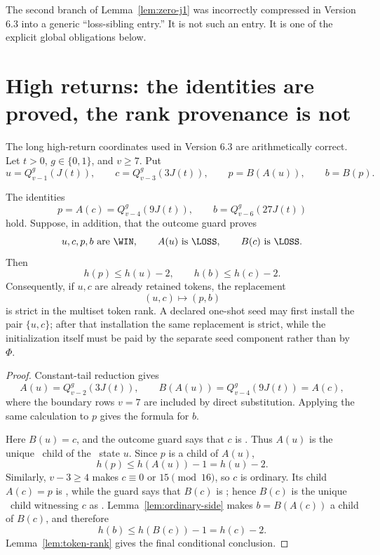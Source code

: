 The second branch of Lemma~\ref{lem:zero-j1} was incorrectly compressed in
Version 6.3 into a generic ``loss-sibling entry.''  It is not such an entry.
It is one of the explicit global obligations below.

\section{High returns: the identities are proved, the rank provenance is not}

The long high-return coordinates used in Version 6.3 are arithmetically
correct.  Let $t>0$, $g\in\{0,1\}$, and $v\ge7$.  Put
\[
 u=Q_{v-1}^g(J(t)),
 \qquad
 c=Q_{v-3}^g(3J(t)),
 \qquad
 p=B(A(u)),
 \qquad
 b=B(p).
\]

\begin{lemma}\label{lem:high-return}
The identities
\[
 p=A(c)=Q_{v-4}^g(9J(t)),
 \qquad
 b=Q_{v-6}^g(27J(t))
\]
hold.  Suppose, in addition, that the outcome guard proves
\[
 u,c,p,b\text{ are \WIN},
 \qquad A(u)\text{ is \LOSS},
 \qquad B(c)\text{ is \LOSS}.
\]
Then
\[
 h(p)\le h(u)-2,
 \qquad
 h(b)\le h(c)-2.
\]
Consequently, if $u,c$ are already retained tokens, the replacement
\[
  (u,c)\longmapsto(p,b)
\]
is strict in the multiset token rank.  A declared one-shot seed may first
install the pair $\{u,c\}$; after that installation the same replacement
is strict, while the initialization itself must be paid by the separate
seed component rather than by $\Phi$.
\end{lemma}

\begin{proof}
Constant-tail reduction gives
\[
 A(u)=Q_{v-2}^g(3J(t)),
 \qquad
 B(A(u))=Q_{v-4}^g(9J(t))=A(c),
\]
where the boundary rows $v=7$ are included by direct substitution.  Applying
the same calculation to $p$ gives the formula for $b$.

Here $B(u)=c$, and the outcome guard says that $c$ is \WIN.  Thus
$A(u)$ is the unique \LOSS\ child of the \WIN\ state $u$.  Since $p$ is a
child of $A(u)$,
\[
 h(p)\le h(A(u))-1=h(u)-2.
\]
Similarly, $v-3\ge4$ makes $c\equiv0$ or $15\pmod {16}$, so $c$ is
ordinary.  Its child $A(c)=p$ is \WIN, while the guard says that $B(c)$ is
\LOSS; hence $B(c)$ is the unique \LOSS\ child witnessing $c$ as \WIN.
Lemma~\ref{lem:ordinary-side} makes $b=B(A(c))$ a child of $B(c)$, and
therefore
\[
 h(b)\le h(B(c))-1=h(c)-2.
\]
Lemma~\ref{lem:token-rank} gives the final conditional conclusion.
\end{proof}

